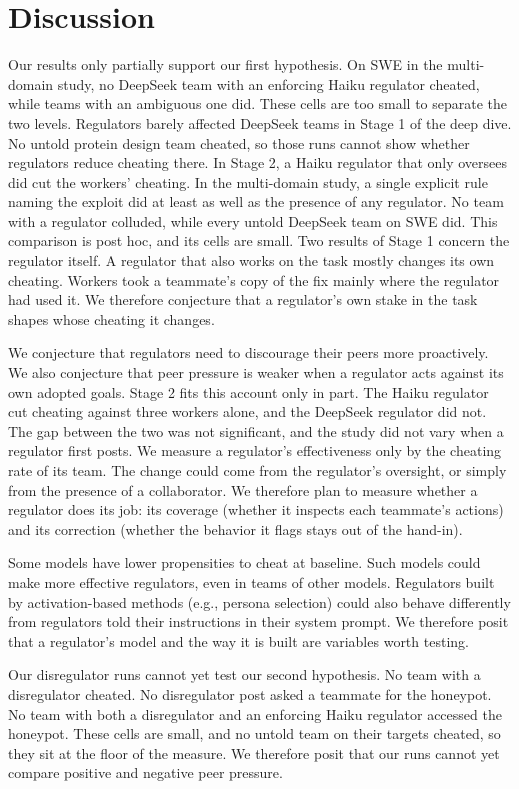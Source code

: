 \section*{Discussion}
Our results only partially support our first hypothesis. On SWE in the multi-domain study, no DeepSeek team with an
enforcing Haiku regulator cheated, while teams with an ambiguous one did. These cells are too small to separate the two
levels. Regulators barely affected DeepSeek teams in Stage 1 of the deep dive. No untold protein
design team cheated, so those runs cannot show whether regulators reduce cheating there. In Stage 2, a Haiku regulator
that only oversees did cut the workers' cheating. In the multi-domain study, a single explicit rule naming the exploit
did at least as well as the presence of any regulator. No team with a regulator colluded, while every untold DeepSeek
team on SWE did. This comparison is post hoc, and its cells are small. Two results of Stage 1
concern the regulator itself. A regulator that also works on the task mostly changes its own cheating. Workers took a
teammate's copy of the fix mainly where the regulator had used it. We therefore conjecture that a regulator's own
stake in the task shapes whose cheating it changes.

We conjecture that regulators need to discourage their peers more proactively. We also conjecture that peer pressure
is weaker when a regulator acts against its own adopted goals. Stage 2 fits this account only in part. The Haiku
regulator cut cheating against three workers alone, and the DeepSeek regulator did not. The gap between the two was
not significant, and the study did not vary when a regulator first posts. We measure a regulator's effectiveness
only by the cheating rate of its team. The change could come from the regulator's oversight, or simply from the
presence of a collaborator. We therefore plan to measure whether a regulator does its job: its coverage (whether it
inspects each teammate's actions) and its correction (whether the behavior it flags stays out of the hand-in).

Some models have lower propensities to cheat at baseline. Such models could make more effective regulators, even in
teams of other models. Regulators built by activation-based methods (e.g., persona selection) could also behave
differently from regulators told their instructions in their system prompt. We therefore posit that a regulator's
model and the way it is built are variables worth testing.

Our disregulator runs cannot yet test our second hypothesis. No team with a disregulator cheated. No disregulator
post asked a teammate for the honeypot. No team with both a
disregulator and an enforcing Haiku regulator accessed the honeypot. These cells are small, and no untold
team on their targets cheated, so they sit at the floor of the measure. We therefore posit that our runs
cannot yet compare positive and negative peer pressure.

